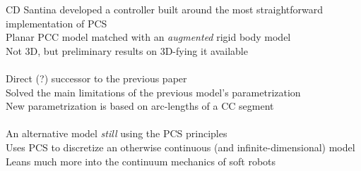 CD Santina developed a controller built around the most straightforward implementation of PCS \cite{della_santina_model-based_2020}\\
Planar PCC model matched with an \textit{augmented} rigid body model \cite{katzschmann_dynamic_2019}\\
Not 3D, but preliminary results on 3D-fying it available\\
\\
Direct (?) successor to the previous paper \cite{della_santina_improved_2020}\\
Solved the main limitations of the previous model's parametrization\\
New parametrization is based on arc-lengths of a CC segment\\
\\
An alternative model \textit{still} using the PCS principles \cite{renda_discrete_2018}\\
Uses PCS to discretize an otherwise continuous (and infinite-dimensional) model\\
Leans much more into the continuum mechanics of soft robots